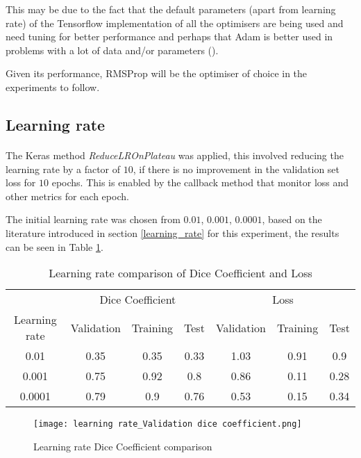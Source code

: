 This may be due to the fact that the default parameters (apart from learning rate) of the Tensorflow implementation of all the optimisers are being used and need tuning for better performance and perhaps that \gls{Adam} is better used in problems with a lot of data and/or parameters (\cite{kingma2017adam}). 

Given its performance, \gls{RMSProp} will be the optimiser of choice in the experiments to follow.
\subsection{Learning rate}
\paragraph{}
The Keras method \textit{ReduceLROnPlateau} was applied, this involved reducing the learning rate by a factor of $10$, if there is no improvement in the validation set loss for $10$ epochs. This is enabled by the callback method that monitor loss and other metrics for each epoch.

The initial learning rate was chosen from $0.01$, $0.001$, $0.0001$, based on the literature introduced in section \ref{learning_rate} for this experiment, the results can be seen in Table \ref{tab_lr}.

\begin{table}[ht!] 
    \begin{center}
    \begin{tabular}{ccccccc} 
    \toprule
       & \multicolumn{3}{c}{Dice Coefficient}     & \multicolumn{3}{c}{Loss} \\
    Learning rate & Validation & Training & Test & Validation & Training & Test \\ \midrule
    0.01 & 0.35 & 0.35 & 0.33 & 1.03 & 0.91 & 0.9  \\ 0.001 & 0.75 & 0.92 & 0.8 & 0.86 & 0.11 & 0.28  \\ \rowcolor{lightgray} 0.0001 & 0.79 & 0.9 & 0.76 & 0.53 & 0.15 & 0.34  \\
\bottomrule
    \end{tabular}
  \end{center} 
  \caption{Learning rate comparison of Dice Coefficient and Loss}\label{tab_lr}
\end{table}
\begin{figure}[hbt!]

\centering
    \texttt{[image: learning rate\_Validation dice coefficient.png]}
    \caption{Learning rate Dice Coefficient comparison}
    \label{lr_dice}
\end{figure}

